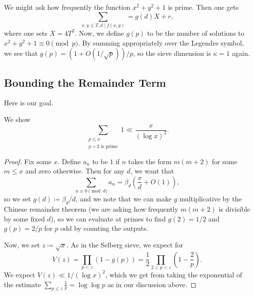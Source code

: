 \documentclass[../notes.tex]{subfiles}
\begin{document}
\begin{example}
	We might ask how frequently the function $x^2+y^2+1$ is prime. Then one gets
	\[\sum_{x,y\le T,d\mid f(x,y)}=g(d)X+r,\]
	where one sets $X=4T^2$. Now, we define $g(p)$ to be the number of solutions to $x^2+y^2+1\equiv0\pmod p$. By summing appropriately over the Legendre symbol, we see that $g(p)=(1+O(1/\sqrt p))/p$, so the sieve dimension is $\kappa=1$ again.
\end{example}

\subsection{Bounding the Remainder Term}
Here is our goal.
\begin{theorem}
	We show
	\[\sum_{\substack{p\le x\\p+2\text{ is prime}}}1\ll\frac x{(\log x)^2}.\]
\end{theorem}
\begin{proof}
	Fix some $x$. Define $a_n$ to be $1$ if $n$ takes the form $m(m+2)$ for some $m\le x$ and zero otherwise. Then for any $d$, we want that
	\[\sum_{n\equiv0\pmod d}a_n=\beta_d\left(\frac xd+O(1)\right),\]
	so we set $g(d)\coloneqq\beta_d/d$, and we note that we can make $g$ multiplicative by the Chinese remainder theorem (we are asking how frequently $m(m+2)$ is divisible by some fixed $d$), so we can evaluate at primes to find $g(2)=1/2$ and $g(p)=2/p$ for $p$ odd by counting the outputs.

	Now, we set $z\coloneqq\sqrt x$. As in the Selberg sieve, we expect for
	\[V(z)=\prod_{p<z}(1-g(p))=\frac12\prod_{2<p<z}\left(1-\frac2p\right).\]
	We expect $V(z)\ll1/(\log x)^2$, which we get from taking the exponential of the estimate $\sum_{p\le z}\frac1p=\log\log p$ as in our discussion above.
\end{proof}
\end{document}
